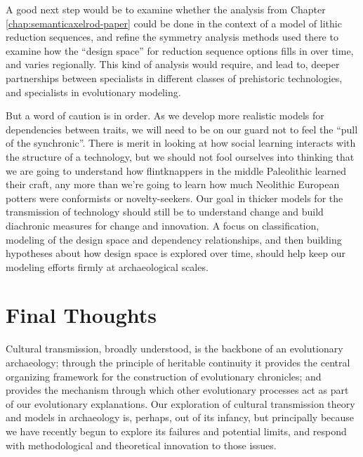 A good next step would be to examine whether the analysis from Chapter \ref{chap:semanticaxelrod-paper} could be done in the context of a model of lithic reduction sequences, and refine the symmetry analysis methods used there to examine how the ``design space'' for reduction sequence options fills in over time, and varies regionally.  This kind of analysis would require, and lead to, deeper partnerships between specialists in different classes of prehistoric technologies, and specialists in evolutionary modeling.  

But a word of caution is in order.  As we develop more realistic models for dependencies between traits, we will need to be on our guard not to feel the ``pull of the synchronic''.  There is merit in looking at how social learning interacts with the structure of a technology, but we should not fool ourselves into thinking that we are going to understand how flintknappers in the middle Paleolithic learned their craft, any more than we're going to learn how much Neolithic European potters were conformists or novelty-seekers.  Our goal in thicker models for the transmission of technology should still be to understand change and build diachronic measures for change and innovation.  A focus on classification, modeling of the design space and dependency relationships, and then building hypotheses about how design space is explored over time, should help keep our modeling efforts firmly at archaeological scales. 

\section{Final Thoughts}\label{conc:sec:final-thoughts}

Cultural transmission, broadly understood, is the backbone of an evolutionary archaeology; through the principle of heritable continuity it provides the central organizing framework for the construction of evolutionary chronicles; and provides the mechanism through which other evolutionary processes act as part of our evolutionary explanations.  Our exploration of cultural transmission theory and models in archaeology is, perhaps, out of its infancy, but principally because we have recently begun to explore its failures and potential limits, and respond with methodological and theoretical innovation to those issues.  

